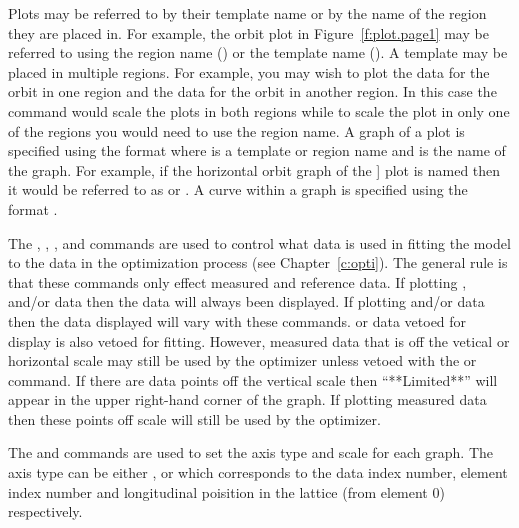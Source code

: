 Plots may be referred to by their template name or by the name of the 
region they are placed in. For example, the orbit plot in 
Figure~\ref{f:plot.page1} may be referred to using the region name ()
or the template name (). A template may be placed in multiple regions.
For example, you may wish to plot the  data for the orbit in one
region and the   data for the orbit in another region. In this case 
the command  would scale the plots in both regions while to scale
the plot in only one of the regions you would need to use the region name. A graph
of a plot is specified using the format  where 
is a template or region name and  is the name of the graph. For example,
if the horizontal orbit graph of the ] plot is named  then it would
be referred to as  or . A curve
within a graph is specified using the format .

The , , , and  commands are used
to control what data is used in fitting the model to the data in the
optimization process (see Chapter~\ref{c:opti}). The general rule is
that these commands only effect measured and reference data. If
plotting ,  and/or  data then the data
will always been displayed. If plotting  and/or  data
then the data displayed will vary with these commands.   or
 data vetoed for display is also vetoed for fitting.  However,
measured data that is off the vetical or horizontal scale may still be
used by the optimizer unless vetoed with the  or 
command.  If there are data points off the vertical scale then
``**Limited**'' will appear in the upper right-hand corner of the
graph. If plotting measured data then these points off scale will
still be used by the optimizer.

The  and  commands are used to set the axis
type and scale for each graph. The axis type can be either ,
 or  which corresponds to the data index number,
element index number and longitudinal poisition in the lattice (from
element 0) respectively.

